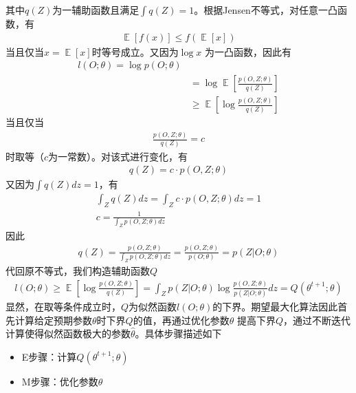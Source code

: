 其中$q(Z)$为一辅助函数且满足$\int q(Z)=1$。根据Jensen不等式\cite{jensen_sur_1906}，对任意一凸函数，有
\begin{equation}\begin{aligned}
\mathop{\mathbb{E}}[f(x)]\leq f(\mathop{\mathbb{E}}[x])
\end{aligned}\end{equation}
当且仅当$x=\mathop{\mathbb{E}}[x]$时等号成立。又因为$\log x$ 为一凸函数，因此有
\begin{equation}\begin{aligned}
l(O;\theta)=\log p(O;\theta)\\
&=\log \mathop{\mathbb{E}}[\frac{p(O,Z;\theta)}{q(Z)}]\\
&\geq  \mathop{\mathbb{E}}[\log\frac{p(O,Z;\theta)}{q(Z)}]
\end{aligned}\end{equation}
当且仅当
\begin{equation}\begin{aligned}
\frac{p(O,Z;\theta)}{q(Z)}=c
\end{aligned}\end{equation}
时取等（$c$为一常数）。对该式进行变化，有
\begin{equation}\begin{aligned}
q(Z)=c\cdot p(O,Z;\theta)
\end{aligned}\end{equation}
又因为$\int q(Z)dz=1$，有
\begin{equation}\begin{aligned}
\int_Z q(Z)dz=\int_Z c\cdot p(O,Z;\theta)dz=1\\
c=\frac{1}{\int_Zp(O,Z;\theta)dz}
\end{aligned}\end{equation}
因此
\begin{equation}\begin{aligned}
q(Z)=\frac{p(O,Z;\theta)}{\int_Zp(O,Z;\theta)dz}=\frac{p(O,Z;\theta)}{p(O;\theta)}=p(Z|O;\theta)
\end{aligned}\end{equation}
代回原不等式，我们构造辅助函数$Q$
\begin{equation}\begin{aligned}
l(O;\theta) \geq  \mathop{\mathbb{E}}[\log\frac{p(O,Z;\theta)}{q(Z)}]=\int_Zp(Z|O;\theta)\log \frac{p(O,Z;\theta)}{p(Z|O;\theta)}dz=Q(\theta^{t+1};\theta)
\end{aligned}\end{equation}
显然，在取等条件成立时，$Q$为似然函数$l(O;\theta)$的下界。期望最大化算法因此首先计算给定预期参数$\theta$时下界$Q$的值，再通过优化参数$\theta$ 提高下界$Q$，通过不断迭代计算使得似然函数极大的参数$\hat{\theta}$。具体步骤描述如下
\begin{itemize}
    \item E步骤：计算$Q(\theta^{t+1};\theta)$
    \item M步骤：优化参数$\theta$
\end{itemize}


